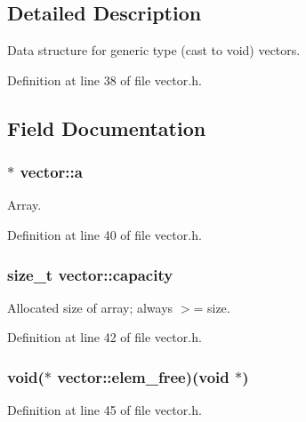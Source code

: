 \subsection{\-Detailed \-Description}
\-Data structure for generic type (cast to void) vectors. 

\-Definition at line 38 of file vector.\-h.



\subsection{\-Field \-Documentation}
\hypertarget{structvector_ae086a0bd5a910803add11ed953819018}{
\subsubsection[{a}]{$\ast$ {\bf vector\-::a}}}\label{structvector_ae086a0bd5a910803add11ed953819018}


\-Array. 



\-Definition at line 40 of file vector.\-h.

\hypertarget{structvector_a59f95fbd95d6f3e84e98a722a66e629a}{
\subsubsection[{capacity}]{\setlength{\rightskip}{0pt plus 5cm}size\-\_\-t {\bf vector\-::capacity}}}\label{structvector_a59f95fbd95d6f3e84e98a722a66e629a}


\-Allocated size of array; always $>$= size. 



\-Definition at line 42 of file vector.\-h.

\hypertarget{structvector_aa707fd886c386fe365b6d6dbadb49733}{
\subsubsection[{elem\-\_\-free}]{\setlength{\rightskip}{0pt plus 5cm}void($\ast$ {\bf vector\-::elem\-\_\-free})(void $\ast$)}}\label{structvector_aa707fd886c386fe365b6d6dbadb49733}


\-Definition at line 45 of file vector.\-h.

